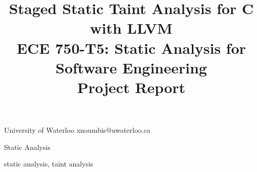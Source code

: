 \documentclass{sigplanconf}
\begin{document}


\title{Staged Static Taint Analysis for C with LLVM\\
	   ECE 750-T5: Static Analysis for Software Engineering\\
	   Project Report}

\date{}

           {University of Waterloo}
           {xnoumbis@uwaterloo.ca}

\maketitle




\terms
Static Analysis

\keywords
static analysis, taint analysis

















\appendix












\end{document}

